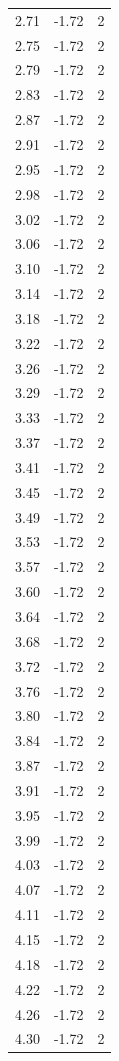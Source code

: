 \begin{longtable}{lrr}
  2.71 & -1.72 & 2 \\
  2.75 & -1.72 & 2 \\
  2.79 & -1.72 & 2 \\
  2.83 & -1.72 & 2 \\
  2.87 & -1.72 & 2 \\
  2.91 & -1.72 & 2 \\
  2.95 & -1.72 & 2 \\
  2.98 & -1.72 & 2 \\
  3.02 & -1.72 & 2 \\
  3.06 & -1.72 & 2 \\
  3.10 & -1.72 & 2 \\
  3.14 & -1.72 & 2 \\
  3.18 & -1.72 & 2 \\
  3.22 & -1.72 & 2 \\
  3.26 & -1.72 & 2 \\
  3.29 & -1.72 & 2 \\
  3.33 & -1.72 & 2 \\
  3.37 & -1.72 & 2 \\
  3.41 & -1.72 & 2 \\
  3.45 & -1.72 & 2 \\
  3.49 & -1.72 & 2 \\
  3.53 & -1.72 & 2 \\
  3.57 & -1.72 & 2 \\
  3.60 & -1.72 & 2 \\
  3.64 & -1.72 & 2 \\
  3.68 & -1.72 & 2 \\
  3.72 & -1.72 & 2 \\
  3.76 & -1.72 & 2 \\
  3.80 & -1.72 & 2 \\
  3.84 & -1.72 & 2 \\
  3.87 & -1.72 & 2 \\
  3.91 & -1.72 & 2 \\
  3.95 & -1.72 & 2 \\
  3.99 & -1.72 & 2 \\
  4.03 & -1.72 & 2 \\
  4.07 & -1.72 & 2 \\
  4.11 & -1.72 & 2 \\
  4.15 & -1.72 & 2 \\
  4.18 & -1.72 & 2 \\
  4.22 & -1.72 & 2 \\
  4.26 & -1.72 & 2 \\
  4.30 & -1.72 & 2 \\

\end{longtable}
